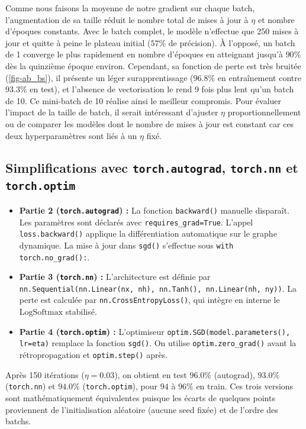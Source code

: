 \documentclass{report}
\begin{document}
Comme nous faisons la moyenne de notre gradient sur chaque batch, l'augmentation de sa taille réduit le nombre total de mises à jour à $\eta$ et nombre d'époques constants. Avec le batch complet, le modèle n'effectue que 250 mises à jour et quitte à peine le plateau initial ($57\%$ de précision). À l'opposé, un batch de 1 converge le plus rapidement en nombre d'époques en atteignant jusqu'à $90\%$ dès la quinzième époque environ. Cependant, sa fonction de perte est très bruitée (\cref{fig-ab_bs}), il présente un léger surapprentissage ($96.8\%$ en entraînement contre $93.3\%$ en test), et l'absence de vectorisation le rend 9 fois plus lent qu'un batch de 10. Ce mini-batch de 10 réalise ainsi le meilleur compromis. Pour évaluer l'impact de la taille de batch, il serait intéressant d'ajuster $\eta$ proportionnellement ou de comparer les modèles dont le nombre de mises à jour est constant car ces deux hyperparamètres sont liés à un $\eta$ fixé.

\subsection{Simplifications avec \texttt{torch.autograd}, \texttt{torch.nn} et \texttt{torch.optim}}
\begin{itemize}
    \item \textbf{Partie 2 (\texttt{torch.autograd}) :} La fonction \texttt{backward()} manuelle disparaît. Les paramètres sont déclarés avec \texttt{requires\_grad=True}. L'appel \texttt{loss.backward()} applique la différentiation automatique sur le graphe dynamique. La mise à jour dans \texttt{sgd()} s'effectue sous \texttt{with torch.no\_grad():}.
    \item \textbf{Partie 3 (\texttt{torch.nn}) :} L'architecture est définie par \texttt{nn.Sequential(nn.Linear(nx, nh), nn.Tanh(), nn.Linear(nh, ny))}. La perte est calculée par \texttt{nn.CrossEntropyLoss()}, qui intègre en interne le $\text{LogSoftmax}$ stabilisé.
    \item \textbf{Partie 4 (\texttt{torch.optim}) :} L'optimiseur \texttt{optim.SGD(model.parameters(), lr=eta)} remplace la fonction \texttt{sgd()}. On utilise \texttt{optim.zero\_grad()} avant la rétropropagation et \texttt{optim.step()} après.
\end{itemize}
Après 150 itérations ($\eta = 0.03$), on obtient en test $96.0\%$ (autograd), $93.0\%$ (\texttt{torch.nn}) et $94.0\%$ (\texttt{torch.optim}), pour $94$ à $96\%$ en train. Ces trois versions sont mathématiquement équivalentes puisque les écarts de quelques points proviennent de l'initialisation aléatoire (aucune seed fixée) et de l'ordre des batchs.
\end{document}
